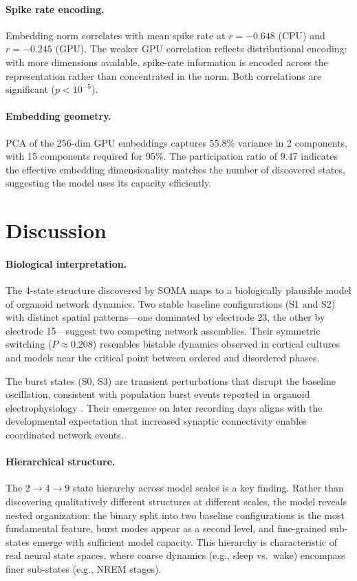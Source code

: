 \documentclass{article}
\begin{document}
\paragraph{Spike rate encoding.} Embedding norm correlates with mean spike rate at $r = -0.648$ (CPU) and $r = -0.245$ (GPU). The weaker GPU correlation reflects distributional encoding: with more dimensions available, spike-rate information is encoded across the representation rather than concentrated in the norm. Both correlations are significant ($p < 10^{-5}$).

\paragraph{Embedding geometry.} PCA of the 256-dim GPU embeddings captures 55.8\% variance in 2 components, with 15 components required for 95\%. The participation ratio of 9.47 indicates the effective embedding dimensionality matches the number of discovered states, suggesting the model uses its capacity efficiently.

\section{Discussion}

\paragraph{Biological interpretation.}
The 4-state structure discovered by SOMA maps to a biologically plausible model of organoid network dynamics. Two stable baseline configurations (S1 and S2) with distinct spatial patterns---one dominated by electrode 23, the other by electrode 15---suggest two competing network assemblies. Their symmetric switching ($P \approx 0.208$) resembles bistable dynamics observed in cortical cultures and models near the critical point between ordered and disordered phases.

The burst states (S0, S3) are transient perturbations that disrupt the baseline oscillation, consistent with population burst events reported in organoid electrophysiology \citep{trujillo2019complex}. Their emergence on later recording days aligns with the developmental expectation that increased synaptic connectivity enables coordinated network events.

\paragraph{Hierarchical structure.}
The $2 \rightarrow 4 \rightarrow 9$ state hierarchy across model scales is a key finding. Rather than discovering qualitatively different structures at different scales, the model reveals nested organization: the binary split into two baseline configurations is the most fundamental feature, burst modes appear as a second level, and fine-grained sub-states emerge with sufficient model capacity. This hierarchy is characteristic of real neural state spaces, where coarse dynamics (e.g., sleep vs.\ wake) encompass finer sub-states (e.g., NREM stages).
\end{document}
